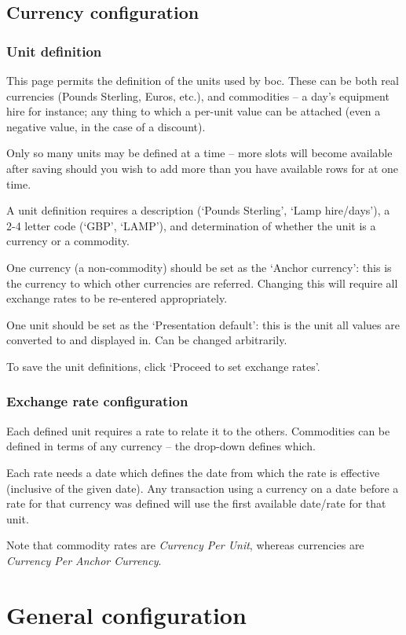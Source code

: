 \documentclass{report}
\begin{document}
\subsection{Currency configuration}\label{edit_units}

\subsubsection{Unit definition}
This page permits the definition of the units used by boc.  These can be both real currencies (Pounds Sterling, Euros, etc.), and commodities -- a day's equipment hire for instance; any thing to which a per-unit value can be attached (even a negative value, in the case of a discount).

Only so many units may be defined at a time -- more slots will become available after saving should you wish to add more than you have available rows for at one time.

A unit definition requires a description (`Pounds Sterling', `Lamp hire/days'), a 2-4 letter code (`GBP', `LAMP'), and determination of whether the unit is a currency or a commodity.

One currency (a non-commodity) should be set as the `Anchor currency': this is the currency to which other currencies are referred.  Changing this will require all exchange rates to be re-entered appropriately.

One unit should be set as the `Presentation default': this is the unit all values are converted to and displayed in.  Can be changed arbitrarily.

To save the unit definitions, click `Proceed to set exchange rates'.

\subsubsection{Exchange rate configuration}
Each defined unit requires a rate to relate it to the others.  Commodities can be defined in terms of any currency -- the drop-down defines which.

Each rate needs a date which defines the date from which the rate is effective (inclusive of the given date).  Any transaction using a currency on a date before a rate for that currency was defined will use the first available date/rate for that unit.

Note that commodity rates are \emph{Currency Per Unit}, whereas currencies are \emph{Currency Per Anchor Currency}.

\section{General configuration}
\end{document}
